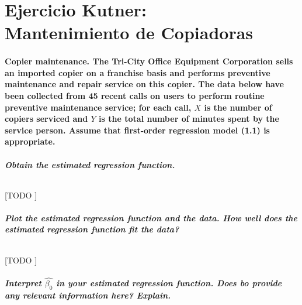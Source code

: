 \documentclass{article}
\begin{document}
  \maketitle


  \part{Ejercicio Kutner:\\ Mantenimiento de Copiadoras}

    \setcounter{section}{1}

    \setcounter{subsection}{19}
    \subsection{\textbf{Copier maintenance}. The Tri-City Office Equipment Corporation sells an imported copier on a franchise basis and performs preventive maintenance and repair service on this copier. The data below have been collected from 45 recent calls on users to perform routine preventive maintenance service; for each call, $X$ is the number of copiers serviced and $Y$ is the total number of minutes spent by the service person. Assume that first-order regression model (1.1) is appropriate.}
    \label{sec:e1-20}

      \subsubsection{Obtain the estimated regression function.}

        \paragraph{}
        [TODO ]

      \subsubsection{Plot the estimated regression function and the data. How well does the estimated regression function fit the data?}

        \paragraph{}
        [TODO ]

      \subsubsection{Interpret $\widehat{\beta_0}$ in your estimated regression function. Does bo provide any relevant information here? Explain.}
\end{document}
